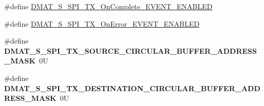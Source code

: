 \begin{DoxyCompactItemize}
\item 
\#define \hyperlink{group___d_m_a_t___s___s_p_i___t_x__module_ga6b71dd023a90ee2906efccb479c6332f}{D\-M\-A\-T\-\_\-\-S\-\_\-\-S\-P\-I\-\_\-\-T\-X\-\_\-\-On\-Complete\-\_\-\-E\-V\-E\-N\-T\-\_\-\-E\-N\-A\-B\-L\-E\-D}
\item 
\#define \hyperlink{group___d_m_a_t___s___s_p_i___t_x__module_ga8b134f28178b5b01064d478a3a76fe18}{D\-M\-A\-T\-\_\-\-S\-\_\-\-S\-P\-I\-\_\-\-T\-X\-\_\-\-On\-Error\-\_\-\-E\-V\-E\-N\-T\-\_\-\-E\-N\-A\-B\-L\-E\-D}
\item 
\hypertarget{group___d_m_a_t___s___s_p_i___t_x__module_ga202956fe09662b8c9992bdef3b4d8c29}{\#define {\bfseries D\-M\-A\-T\-\_\-\-S\-\_\-\-S\-P\-I\-\_\-\-T\-X\-\_\-\-S\-O\-U\-R\-C\-E\-\_\-\-C\-I\-R\-C\-U\-L\-A\-R\-\_\-\-B\-U\-F\-F\-E\-R\-\_\-\-A\-D\-D\-R\-E\-S\-S\-\_\-\-M\-A\-S\-K}~0\-U}\label{group___d_m_a_t___s___s_p_i___t_x__module_ga202956fe09662b8c9992bdef3b4d8c29}

\item 
\hypertarget{group___d_m_a_t___s___s_p_i___t_x__module_gaf63c4917ca75ba827f0609f3acff1be6}{\#define {\bfseries D\-M\-A\-T\-\_\-\-S\-\_\-\-S\-P\-I\-\_\-\-T\-X\-\_\-\-D\-E\-S\-T\-I\-N\-A\-T\-I\-O\-N\-\_\-\-C\-I\-R\-C\-U\-L\-A\-R\-\_\-\-B\-U\-F\-F\-E\-R\-\_\-\-A\-D\-D\-R\-E\-S\-S\-\_\-\-M\-A\-S\-K}~0\-U}\label{group___d_m_a_t___s___s_p_i___t_x__module_gaf63c4917ca75ba827f0609f3acff1be6}

\end{DoxyCompactItemize}
